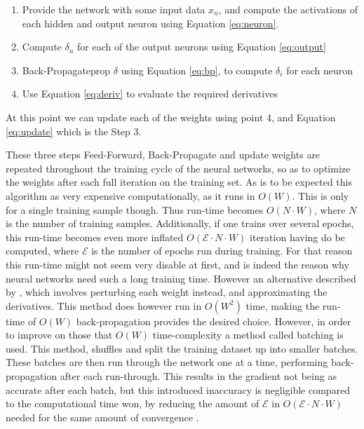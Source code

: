 \begin{enumerate}
    \item

        Provide the network with some input data $x_n$, and compute the
        activations of each hidden and output neuron using Equation
        \eqref{eq:neuron}.

    \item

        Compute $\delta_n$ for each of the output neurons using Equation
        \eqref{eq:output}

    \item

        Back-Propagateprop $\delta$ using Equation \eqref{eq:bp}, to compute
        $\delta_i$ for each neuron

    \item

        Use Equation \eqref{eq:deriv} to evaluate the required derivatives

\end{enumerate}

At this point we can update each of the weights using point 4, and Equation
\eqref{eq:update} which is the Step 3.

These three steps Feed-Forward, Back-Propagate and update weights are repeated
throughout the training cycle of the neural networks, so as to optimize the
weights after each full iteration on the training set. As is to be expected
this algorithm as very expensive computationally, as it runs in $O(W)$. This is
only for a single training sample though. Thus run-time becomes $O(N\cdot W)$,
where $N$ is the number of training samples. Additionally, if one trains over
several epochs, this run-time becomes even more inflated $O(\mathcal{E}\cdot
N\cdot W)$ iteration having do be computed, where $\mathcal{E}$ is the number
of epochs run during training. For that reason this run-time might not seem
very disable at first, and is indeed the reason why neural networks need such
a long training time. However an alternative described by \citet{Bishop}, which
involves perturbing each weight instead, and approximating the derivatives.
This method does however run in $O(W^2)$ time, making the run-time of $O(W)$
back-propagation provides the desired choice. However, in order to improve
on those that $O(W)$ time-complexity a method called batching is used. This
method, shuffles and split the training dataset up into smaller batches.
These batches are then run through the network one at a time, performing
back-propagation after each run-through. This results in the gradient not
being as accurate after each batch, but this introduced inaccuracy is
negligible compared to the computational time won, by reducing the amount of
$\mathcal{E}$ in $O(\mathcal{E}\cdot N\cdot W)$ needed for the same amount of
convergence \citep{Bishop}.


